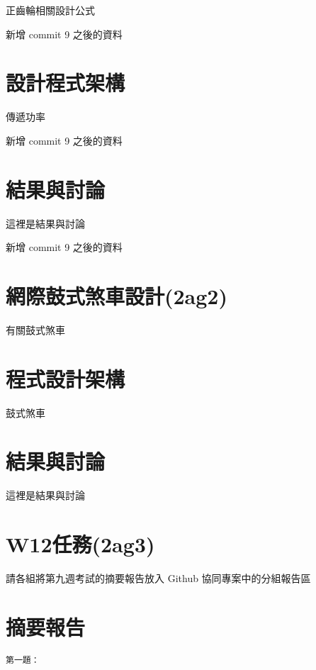 \documentclass[]{article}
\begin{document}
正齒輪相關設計公式

新增 commit 9 之後的資料

\section{設計程式架構}\label{ux8a2dux8a08ux7a0bux5f0fux67b6ux69cb}

傳遞功率

新增 commit 9 之後的資料

\section{結果與討論}\label{ux7d50ux679cux8207ux8a0eux8ad6}

這裡是結果與討論

新增 commit 9 之後的資料

\section{網際鼓式煞車設計(2ag2)}\label{ux7db2ux969bux9f13ux5f0fux715eux8ecaux8a2dux8a082ag2}

有關鼓式煞車

\section{程式設計架構}\label{ux7a0bux5f0fux8a2dux8a08ux67b6ux69cb}

鼓式煞車

\section{結果與討論}\label{ux7d50ux679cux8207ux8a0eux8ad6-1}

這裡是結果與討論

\section{W12任務(2ag3)}\label{w12ux4efbux52d92ag3}

請各組將第九週考試的摘要報告放入 Github 協同專案中的分組報告區

\section{摘要報告}\label{ux6458ux8981ux5831ux544a}

\begin{verbatim}
第一題：
\end{verbatim}
\end{document}
